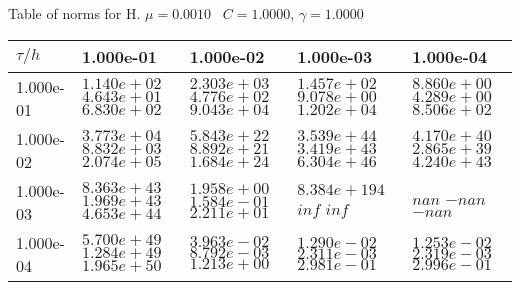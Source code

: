 \begin{center}
Table of norms for H. $\mu = 0.0010$ \, $C = 1.0000$, $\gamma = 1.0000$
  
\begin{tabular}{|p{1in}|p{1in}|p{1in}|p{1in}|p{1in}|} \hline
$\tau / h$ &1.000e-01 &1.000e-02 &1.000e-03 &1.000e-04 \\ \hline 
1.000e-01 & $1.140e+02$  $4.643e+01$  $6.830e+02$  & $2.303e+03$  $4.776e+02$  $9.043e+04$  & $1.457e+02$  $9.078e+00$  $1.202e+04$  & $8.860e+00$  $4.289e+00$  $8.506e+02$  \\ \hline 
1.000e-02 & $3.773e+04$  $8.832e+03$  $2.074e+05$  & $5.843e+22$  $8.892e+21$  $1.684e+24$  & $3.539e+44$  $3.419e+43$  $6.304e+46$  & $4.170e+40$  $2.865e+39$  $4.240e+43$  \\ \hline 
1.000e-03 & $8.363e+43$  $1.969e+43$  $4.653e+44$  & $1.958e+00$  $1.584e-01$  $2.211e+01$  & $8.384e+194$  $inf$  $inf$  & $nan$  $-nan$  $-nan$  \\ \hline 
1.000e-04 & $5.700e+49$  $1.284e+49$  $1.965e+50$  & $3.963e-02$  $8.792e-03$  $1.213e+00$  & $1.290e-02$  $2.311e-03$  $2.981e-01$  & $1.253e-02$  $2.319e-03$  $2.996e-01$  \\ \hline 

\end{tabular}\\[20pt]
\end{center}
